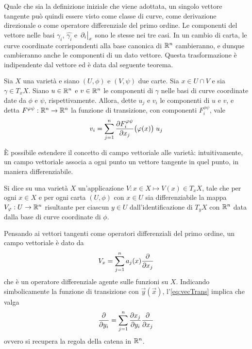 Quale che sia la definizione iniziale che viene adottata, un singolo vettore tangente può quindi essere visto come classe di curve, come derivazione direzionale o come operatore differenziale del primo ordine. Le componenti del vettore nelle basi  $\gamma_i$, $\hat{\gamma_i}$ e $\eval{\partial_i}_x$ sono le stesse nei tre casi. In un cambio di carta, le curve coordinate corrispondenti alla base canonica di $\mathbb{R}^{n}$ cambieranno, e dunque cambieranno anche le componenti di un dato vettore. Questa trasformazione è indipendente dal vettore ed è data dal seguente teorema.
\begin{theorem} 
  Sia $X$ una varietà e siano $(U,\phi)$ e $(V,\psi)$ due carte. Sia $x \in  U \cap V$ e sia $\gamma \in  T_x X$. Siano $u \in \mathbb{R}^{n}$ e $v \in  \mathbb{R}^{n}$ le componenti di $\gamma$ nelle basi di curve coordinate date da $\phi$ e $\psi$, rispettivamente. Allora, dette $u_j$ e $v_i$ le componenti di $u$ e $v$, e detta $F^{\varphi\psi}:\mathbb{R}^{n} \to \mathbb{R}^{n}$ la funzione di transizione, con componenti $F^{\phi \psi}_i$, vale \begin{equation} \label{eq:vecTrans}
  v_i = \sum_{j=1}^n \pdv{F^{\varphi\psi}_i}{x_j}\big(\varphi(x)\big)\; u_j
  \end{equation} 
\end{theorem}

È possibile estendere il concetto di campo vettoriale alle varietà: intuitivamente, un campo vettoriale associa a ogni punto un vettore tangente in quel punto, in maniera differenziabile.
\begin{definition} \label{def:vecField}
  Si dice  su una varietà $X$ un'applicazione $V: x \in  X \mapsto V (x) \in T_x X$, tale che per ogni $x \in X$ e per ogni carta $(U, \phi)$ con $x \in U$ sia differenziabile la mappa $V_\varphi:U \to \mathbb{R}^{n}$ risultante per ciascun $y \in  U$ dall'identificazione di $T_y X$ con $\mathbb{R}^{n}$ data dalla base di curve coordinate di $\phi$.
\end{definition}

Pensando ai vettori tangenti come operatori differenziali del primo ordine, un campo vettoriale è dato da
\begin{equation*}
  V_x = \sum_{j=1}^{n} a_j(x) \pdv{x_j}
\end{equation*} 
che è un operatore differenziale agente sulle funzioni su $X$. Indicando simbolicamente la funzione di transizione con $\vec{y}(\vec{x})$, l'\autoref{eq:vecTrans} implica che valga 
\begin{equation*}
  \pdv{y_i} = \sum_{j=1}^{n} \pdv{x_j}{y_i} \pdv{x_j}
\end{equation*} 
ovvero si recupera la regola della catena in $\mathbb{R}^{n}$.

